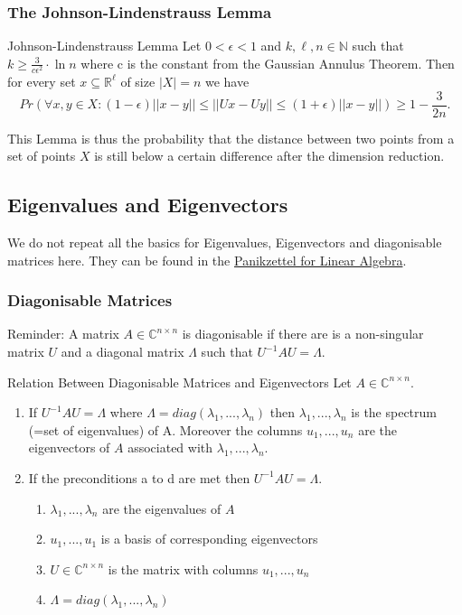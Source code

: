 \documentclass{panikzettel}
\begin{document}
\subsubsection{The Johnson-Lindenstrauss Lemma}

\begin{theo}{Johnson-Lindenstrauss Lemma}
Let $0<\epsilon<1$ and $ k,\ell,n\in\mathbb{N}$ such that $k\geq \frac{3}{c\epsilon^2}\cdot \ln n$ where c is the constant from the Gaussian Annulus Theorem. Then for every set $x\subseteq \mathbb{R}^\ell$ of size $|X|=n$ we have
\[
Pr\left( \forall x,y\in X : (1-\epsilon) ||x-y||\leq ||Ux-Uy|| \leq (1+\epsilon) ||x-y|| \right)\geq 1-\frac{3}{2n}.
\]
\end{theo}
This Lemma is thus the probability that the distance between two points from a set of points $X$ is still below a certain difference after the dimension reduction.


\subsection{Eigenvalues and Eigenvectors}
We do not repeat all the basics for Eigenvalues, Eigenvectors and diagonisable matrices here. They can be found in the \href{https://panikzettel.philworld.de/la.pdf}{Panikzettel for Linear Algebra}.

\subsubsection{Diagonisable Matrices}
Reminder: A matrix $A\in\mathbb{C}^{n\times n}$ is diagonisable if there are is a non-singular matrix $U$ and a diagonal matrix $\Lambda$ such that $U^{-1}AU=\Lambda$.

\begin{theo}{Relation Between Diagonisable Matrices and Eigenvectors}
Let $A\in\mathbb{C}^{n\times n}$.
\begin{enumerate}
\item If $U^{-1}AU=\Lambda$ where $\Lambda=diag(\lambda_1,...,\lambda_n)$ then $\lambda_1,...,\lambda_n$ is the spectrum (=set of eigenvalues) of A. Moreover the columns $u_1,...,u_n$ are the eigenvectors of $A$ associated with $\lambda_1,...,\lambda_n$.
\item If the preconditions a to d are met then $U^{-1}AU=\Lambda$.
\begin{enumerate}
\item $\lambda_1,...,\lambda_n$ are the eigenvalues of $A$
\item $u_1,...,u_1$ is a basis of corresponding eigenvectors
\item $U\in\mathbb{C}^{n\times n}$ is the matrix with columns $u_1,...,u_n$
\item $\Lambda=diag(\lambda_1,...,\lambda_n)$
\end{enumerate}
\end{enumerate}
\end{theo}
\end{document}
